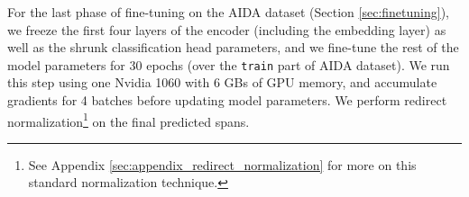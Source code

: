 \documentclass[11pt]{article}
\begin{document}
For the last phase of fine-tuning on the AIDA dataset (Section \ref{sec:finetuning}), we freeze the first four layers of the encoder (including the embedding layer) as well as the shrunk classification head parameters, and we fine-tune the rest of the model parameters for 30 epochs (over the \texttt{train} part of AIDA dataset). We run this step using one Nvidia 1060 with 6 GBs of GPU memory, and accumulate gradients \cite{W18-6301} for 4 batches before updating model parameters. We perform redirect normalization\footnote{See Appendix \ref{sec:appendix_redirect_normalization} for more on this standard normalization technique.} on the final predicted spans.

\begin{table*}[t]
\centering
{}
\end{table*}
\end{document}
